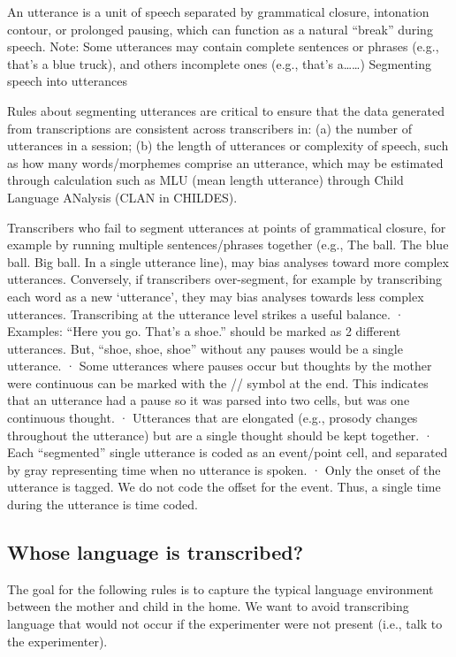 \documentclass[
  12pt,
]{book}
\begin{document}
An utterance is a unit of speech separated by grammatical closure, intonation contour, or prolonged pausing, which can function as a natural ``break'' during speech. Note: Some utterances may contain complete sentences or phrases (e.g., that's a blue truck), and others incomplete ones (e.g., that's a\ldots\ldots)
Segmenting speech into utterances

Rules about segmenting utterances are critical to ensure that the data generated from transcriptions are consistent across transcribers in: (a) the number of utterances in a session; (b) the length of utterances or complexity of speech, such as how many words/morphemes comprise an utterance, which may be estimated through calculation such as MLU (mean length utterance) through Child Language ANalysis (CLAN in CHILDES).

Transcribers who fail to segment utterances at points of grammatical closure, for example by running multiple sentences/phrases together (e.g., The ball. The blue ball. Big ball. In a single utterance line), may bias analyses toward more complex utterances. Conversely, if transcribers over-segment, for example by transcribing each word as a new `utterance', they may bias analyses towards less complex utterances. Transcribing at the utterance level strikes a useful balance.
· Examples: ``Here you go. That's a shoe.'' should be marked as 2 different utterances. But, ``shoe, shoe, shoe'' without any pauses would be a single utterance.
· Some utterances where pauses occur but thoughts by the mother were continuous can be marked with the // symbol at the end. This indicates that an utterance had a pause so it was parsed into two cells, but was one continuous thought.
· Utterances that are elongated (e.g., prosody changes throughout the utterance) but are a single thought should be kept together.
· Each ``segmented'' single utterance is coded as an event/point cell, and separated by gray representing time when no utterance is spoken.
· Only the onset of the utterance is tagged. We do not code the offset for the event. Thus, a single time during the utterance is time coded.

\hypertarget{whose-language-is-transcribed}{%
\subsection{Whose language is transcribed?}\label{whose-language-is-transcribed}}

The goal for the following rules is to capture the typical language environment between the mother and child in the home. We want to avoid transcribing language that would not occur if the experimenter were not present (i.e., talk to the experimenter).
\end{document}

